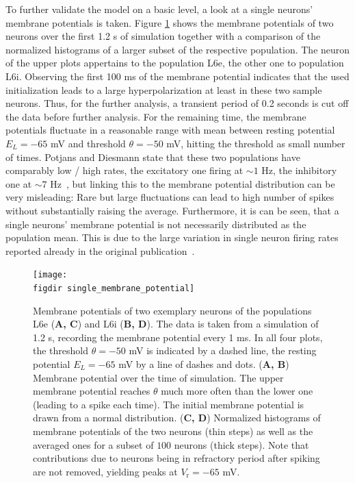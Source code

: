 To further validate the model on a basic level, a look at a single neurons' membrane potentials 
is taken. Figure \ref{fig:single_membrane_potential} shows the membrane 
potentials of two neurons over the first 1.2 s of simulation together with a comparison of
the normalized histograms of a larger subset of the 
respective population. The neuron of the upper plots appertains to the population
L6e, the other one to population L6i. 
Observing the first 100 ms of the membrane potential 
indicates that the used initialization leads to a large hyperpolarization at least in these two 
sample neurons. Thus, for the further analysis, a transient period of 0.2 seconds is cut off the
data before further analysis. For the remaining time, the membrane potentials fluctuate 
in a reasonable range with mean between resting potential $E_L = -65$ mV and threshold $\theta = -50$ mV, 
hitting the threshold as small number of times. 
Potjans and Diesmann state that
these two populations have comparably low / high rates, the excitatory one firing at 
$\sim 1$ Hz, the inhibitory one at $\sim 7$ Hz~\cite{potjans2014}, 
but linking this to the membrane potential distribution can be very misleading:
Rare but large fluctuations can lead to high number of spikes without substantially 
raising the average. 
Furthermore, it is can be seen, that a single 
neurons' membrane potential is not necessarily distributed as the population mean. 
This is due to the large variation in single neuron firing rates reported already in the 
original publication~\cite{potjans2014}. 

\begin{figure}[tb]
    \centering
    \texttt{[image: \\figdir single\_membrane\_potential]}
    \caption{
        Membrane potentials of two exemplary neurons of the populations 
        L6e (\textbf{A, C}) and L6i (\textbf{B, D}). The data is taken from 
        a simulation of 1.2 s, recording the membrane potential every 1 ms. 
        In all four plots, the threshold $\theta = -50$ mV is indicated by a dashed line, 
        the resting potential $E_L = -65$ mV by a line of dashes and dots. 
        \quad (\textbf{A, B}) Membrane potential over the time of simulation. 
        The upper membrane potential reaches $\theta$ much more often than the lower one 
        (leading to a spike each time). The initial membrane potential 
        is drawn from a normal distribution.
        \quad (\textbf{C, D}) Normalized histograms of membrane potentials of the
        two neurons (thin steps) as well as the averaged ones for a subset of $100$ 
        neurons (thick steps). 
        Note that contributions due to neurons being in refractory 
        period after spiking are not removed, yielding peaks at $V_\text{r} = -65$ mV. 
    }
    \label{fig:single_membrane_potential}
\end{figure}



